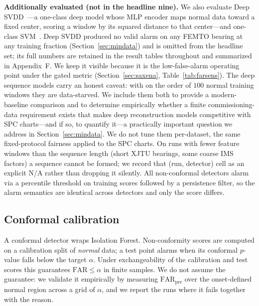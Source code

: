 \documentclass[journal]{IEEEtran}
\begin{document}
\textbf{Additionally evaluated (not in the headline nine).} We also evaluate Deep
SVDD~\cite{ruff2018}---a one-class deep model whose MLP encoder maps normal data
toward a fixed center, scoring a window by its squared distance to that
center---and one-class SVM~\cite{scholkopf2001}. Deep SVDD produced no valid
alarm on any FEMTO bearing at any training fraction (Section~\ref{sec:mindata})
and is omitted from the headline set; its full numbers are retained in the
result tables throughout and summarized in Appendix~F. We keep it visible
because it is the low-false-alarm operating point under the gated metric
(Section~\ref{sec:saxena}, Table~\ref{tab:farsens}).
The deep sequence models carry an honest caveat: with on the order of $100$
normal training windows they are data-starved. We include them both to provide a
modern-baseline comparison and to determine empirically whether a finite
commissioning-data requirement exists that makes deep reconstruction models
competitive with SPC charts---and if so, to quantify it---a practically important
question we address in Section~\ref{sec:mindata}. We do not tune them
per-dataset, the same fixed-protocol fairness applied to the SPC charts.
On runs with fewer feature windows than the sequence length (short XJTU bearings,
some coarse IMS factors) a sequence cannot be formed; we record that
(run, detector) cell as an explicit N/A rather than dropping it silently. All
non-conformal detectors alarm via a percentile threshold on training scores
followed by a persistence filter, so the alarm semantics are identical across
detectors and only the score differs.

\subsection{Conformal calibration}
A conformal detector \cite{vovk2005} wraps Isolation Forest. Non-conformity
scores are computed on a calibration split of \emph{normal} data; a test point
alarms when its conformal $p$-value falls below the target $\alpha$. Under
exchangeability of the calibration and test scores this guarantees
$\mathrm{FAR}\le\alpha$ in finite samples. We do not assume the guarantee: we
validate it empirically by measuring $\mathrm{FAR}_{\mathrm{pre}}$ over the
onset-defined normal region across a grid of $\alpha$, and we report the runs
where it fails together with the reason.
\end{document}
